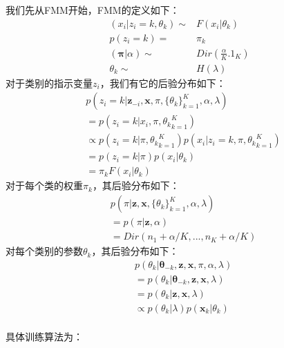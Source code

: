 我们先从FMM开始，FMM的定义如下：
\begin{displaymath}
\begin{split}
(x_i|z_i=k, \theta_k) \sim & F(x_i|\theta_k)\\
p(z_i=k) = & \pi_k\\
(\boldsymbol{\pi}|\alpha) \sim &Dir(\frac{\alpha}{K} . \mathrm{1}_{K} )\\
\theta_k \sim & H(\lambda)
\end{split}
\end{displaymath}
对于类别的指示变量$z_i$，我们有它的后验分布如下：
\begin{displaymath}
\begin{split}
&p(z_i=k | \mathbf{z}_{-i}, \mathbf{x}, \pi, \{\theta_k\}_{k=1}^{K}, \alpha, \lambda)\\
&= p(z_i=k | x_i, \pi, {\theta_k}_{k=1}^{K})\\
& \propto p(z_i=k | \pi, {\theta_k}_{k=1}^{K}) p(x_i| z_i=k, \pi, {\theta_k}_{k=1}^{K})\\
&= p(z_i=k | \pi) p(x_i| \theta_k)\\
&= \pi_k F(x_i|\theta_k)
\end{split}
\end{displaymath}
对于每个类的权重$\pi_k$，其后验分布如下：
\begin{displaymath}
\begin{split}
&p(\pi | \mathbf{z}, \mathbf{x}, \{\theta_k\}_{k=1}^{K}, \alpha, \lambda)\\
&= p(\pi | \mathbf{z}, \alpha)\\
&= Dir(n_1+\alpha/K, ... , n_K + \alpha/K)
\end{split}
\end{displaymath}
对每个类别的参数$\theta_k$，其后验分布如下：
\begin{displaymath}
\begin{split}
&p(\theta_k | \mathbf{\theta}_{-k}, \mathbf{z}, \mathbf{x}, \pi, \alpha, \lambda)\\
&= p(\theta_k | \mathbf{\theta}_{-k}, \mathbf{z}, \mathbf{x},\lambda)\\
&= p(\theta_k |\mathbf{z}, \mathbf{x},\lambda)\\
&\propto p(\theta_k |\lambda) p(\mathbf{x}_k|\theta_k)\\
\end{split}
\end{displaymath}

具体训练算法为：

